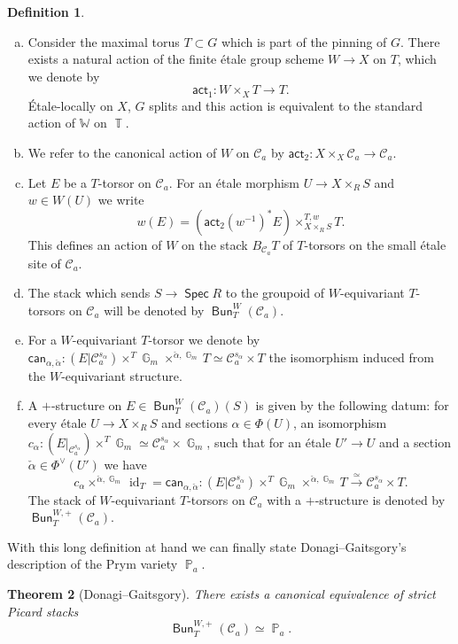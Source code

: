 \documentclass{article}
\DeclareMathOperator{\Bun}{\mathsf{Bun}}
\newcommand{\Cc}{\mathcal{C}}
\DeclareMathOperator{\Pb}{\mathbb{P}}
\DeclareMathOperator{\id}{id}
\DeclareMathOperator{\G}{\mathbb{G}}
\DeclareMathOperator{\Tb}{\mathbb{T}}
\DeclareMathOperator{\Spec}{\mathsf{Spec}}
\theoremstyle{definition}
\newtheorem{definition}{Definition}[section]
\theoremstyle{plain}
\newtheorem{theorem}[definition]{Theorem}
\begin{document}
\begin{definition}\label{defi:donagi-gaitsgory}
\begin{enumerate}[(a)]
\item Consider the maximal torus $T \subset G$ which is part of the pinning of $G$. There exists a natural action of the finite \'etale group scheme $W \to X$ on $T$, which we denote by 
$$\mathsf{act}_1\colon W \times_X T \to T.$$ 
\'Etale-locally on $X$, $G$ splits and this action is equivalent to the standard action of $\mathbb{W}$ on $\Tb$. 
\item We refer to the canonical action of $W$ on $\Cc_a$ by $\mathsf{act}_2\colon X \times_X \Cc_a \to \Cc_a$.
\item Let $E$ be a $T$-torsor on $\Cc_a$. For an \'etale morphism $U \to X \times_R S$ and $w \in W(U)$ we write
$$w(E) = (\mathsf{act}_2(w^{-1})^*E) \times^{T,w}_{X \times_R S} T.$$
This defines an action of $W$ on the stack $B_{\Cc_a}T$ of $T$-torsors on the small \'etale site of $\Cc_a$. 
\item The stack which sends $S \to \Spec R$ to the groupoid of $W$-equivariant $T$-torsors on $\Cc_a$ will be denoted by $\Bun^W_T(\Cc_a)$.
\item For a $W$-equivariant $T$-torsor we denote by $\mathsf{can_{\alpha,\check \alpha}}\colon (E|\Cc^{s_\alpha}_a) \times^T \G_m \times^{\check \alpha,\G_m} T \simeq \Cc_a^{s_\alpha} \times T$ the isomorphism induced from the $W$-equivariant structure.
\item A $+$-structure on $E \in \Bun^W_T(\Cc_a)(S)$ is given by the following datum: for every \'etale $U \to X \times_R S$ and sections $\alpha \in \Phi(U)$, an isomorphism $c_{\alpha}\colon (E|_{\Cc_a^{s_\alpha}}) \times^T \G_m \simeq \Cc_a^{s_\alpha} \times \G_m$, such that for an \'etale $U' \to U$ and a section $\check \alpha \in \Phi^{\vee}(U')$ we have
$$c_{\alpha} \times^{\check \alpha,\G_m} \id_T = \mathsf{can}_{\alpha,\check \alpha}\colon (E|\Cc^{s_\alpha}_a) \times^T \G_m \times^{\check \alpha,\G_m} T \xrightarrow{\simeq} \Cc_a^{s_\alpha} \times T.$$
The stack of $W$-equivariant $T$-torsors on $\Cc_a$ with a $+$-structure is denoted by $\Bun_T^{W,+}(\Cc_a)$.
\end{enumerate}
\end{definition}

With this long definition at hand we can finally state Donagi--Gaitsgory's description of the Prym variety $\Pb_a$.

\begin{theorem}[Donagi--Gaitsgory]\label{thm:dg}
There exists a canonical equivalence of strict Picard stacks 
\[\Bun_T^{W,+}(\Cc_a) \simeq \Pb_a.\]
\end{theorem}
\end{document}
